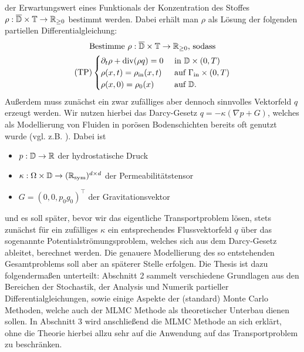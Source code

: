 der Erwartungswert eines Funktionals der  Konzentration des Stoffes $\rho: \overline{\mathbb{D}} \times \mathbb{T}  \rightarrow \mathbb{R}_{\geq0}$ bestimmt werden. Dabei erhält man $\rho$ als Lösung der folgenden partiellen Differentialgleichung:
\begin{gather*}
\text{Bestimme } \rho: \overline{\mathbb{D}} \times \mathbb{T} \to \mathbb{R}_{\geq 0} \text{, sodass}\\
(\text{TP})
\begin{cases}
\partial_t \rho + \operatorname{div}(\rho q) = 0 &\text{ in } \mathbb{D} \times (0,T)\\
\rho(x,t) = \rho_{\text{in}}(x,t) &\text{ auf } \Gamma_{\text{in}} \times (0,T)\\
\rho(x,0) = \rho_0(x) &\text{ auf } \mathbb{D}.
\end{cases}
\end{gather*}
Außerdem muss zunächst ein zwar zufälliges aber dennoch sinnvolles Vektorfeld $q$ erzeugt werden. Wir nutzen hierbei das Darcy-Gesetz $q = - \kappa (\nabla p + G)$, welches als Modellierung von Fluiden in porösen Bodenschichten bereits oft genutzt wurde (vgl. z.B. \cite{de1986quantitative}).
Dabei ist 
\begin{itemize}
	\item $p:\mathbb{D} \rightarrow \mathbb{R}$ der hydrostatische Druck
	\item $\kappa: \Omega \times \mathbb{D} \rightarrow (\mathbb{R}_{\text{sym}})^{d \times d}$ der Permeabilitätstensor 
	\item $G = (0,0,p_0 g_0)^{\top}$ der Gravitationsvektor	
\end{itemize}
und es soll später, bevor wir das eigentliche Transportproblem lösen, stets zunächst für ein zufälliges $\kappa$ ein entsprechendes Flussvektorfeld $q$ über das sogenannte Potentialströmungsproblem, welches sich aus dem Darcy-Gesetz ableitet, berechnet werden. 
Die genauere Modellierung des so entstehenden Gesamtproblems soll aber an späterer Stelle erfolgen. \newline
Die Thesis ist dazu folgendermaßen unterteilt:\newline 
Abschnitt 2 sammelt verschiedene Grundlagen aus den Bereichen der Stochastik, der Analysis und Numerik partieller Differentialgleichungen, sowie einige Aspekte der (standard) Monte Carlo Methoden, welche auch der MLMC Methode als theoretischer Unterbau dienen sollen. \newline
In Abschnitt 3 wird anschließend die MLMC Methode an sich erklärt, ohne die Theorie hierbei allzu sehr auf die Anwendung auf das Transportproblem zu beschränken. \newline
